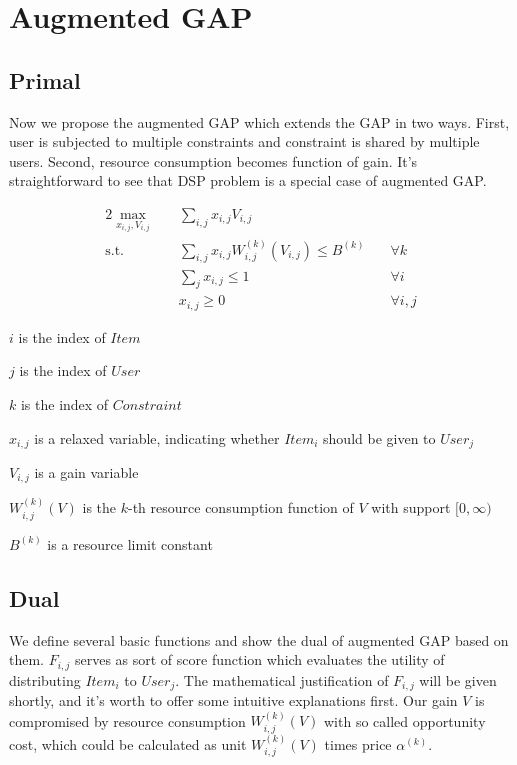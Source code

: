 \documentclass[sigconf]{acmart}
\newcommand{\sumj}{\sum\limits_j}
\newcommand{\sumij}{\sum\limits_{i,j}}
\newcommand{\sx}{x_{i,j}}
\newcommand{\sV}{V_{i,j}}
\newcommand{\sW}{W_{i,j}^{(k)}}
\newcommand{\sB}{B^{(k)}}
\newcommand{\salpha}{\alpha^{(k)}}
\newcommand{\sF}{F_{i,j}}
\newcommand{\agapresourceconstraint}{\sumij \sx \sW(\sV) \le \sB}
\newcommand{\assignmentconstraint}{\sumj \sx \le 1}
\begin{document}
\section{Augmented GAP}

\subsection{Primal}

Now we propose the augmented GAP which extends the GAP in two ways.
First, user is subjected to multiple constraints and constraint is shared by multiple users.
Second, resource consumption becomes function of gain.
It's straightforward to see that DSP problem is a special case of augmented GAP.

\begin{alignat}{2}
    \max\limits_{\sx, \sV} \quad & \sumij \sx \sV \quad              & {} \\
    \mbox{s.t.} \quad            & \agapresourceconstraint \quad     & \forall k \\
    \quad                        & \assignmentconstraint \quad       & \forall i \\
    \quad                        & \sx \ge 0 \quad                   & \forall i,j
\end{alignat}

$i$ is the index of $Item$

$j$ is the index of $User$

$k$ is the index of $Constraint$

$\sx$ is a relaxed variable, indicating whether $Item_i$ should be given to $User_j$

$\sV$ is a gain variable

$\sW(V)$ is the $k$-th resource consumption function of $V$ with support $[0, \infty)$

$\sB$ is a resource limit constant

\subsection{Dual}

We define several basic functions and show the dual of augmented GAP based on them.
$\sF$ serves as sort of score function which evaluates the utility of distributing $Item_i$ to $User_j$.
The mathematical justification of $\sF$ will be given shortly, and it's worth to offer some intuitive explanations first.
Our gain $V$ is compromised by resource consumption $\sW(V)$ with so called opportunity cost,
    which could be calculated as unit $\sW(V)$ times price $\salpha$.
\end{document}
